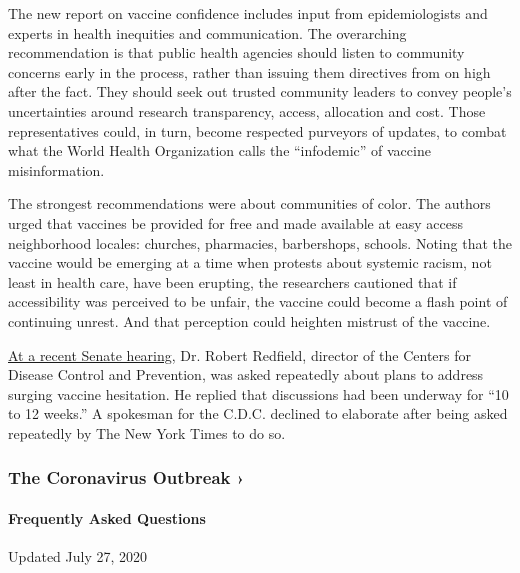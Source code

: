 The new report on vaccine confidence includes input from epidemiologists
and experts in health inequities and communication. The overarching
recommendation is that public health agencies should listen to community
concerns early in the process, rather than issuing them directives from
on high after the fact. They should seek out trusted community leaders
to convey people's uncertainties around research transparency, access,
allocation and cost. Those representatives could, in turn, become
respected purveyors of updates, to combat what the World Health
Organization calls the ``infodemic'' of vaccine misinformation.

The strongest recommendations were about communities of color. The
authors urged that vaccines be provided for free and made available at
easy access neighborhood locales: churches, pharmacies, barbershops,
schools. Noting that the vaccine would be emerging at a time when
protests about systemic racism, not least in health care, have been
erupting, the researchers cautioned that if accessibility was perceived
to be unfair, the vaccine could become a flash point of continuing
unrest. And that perception could heighten mistrust of the vaccine.

\href{https://www.nytimes3xbfgragh.onion/2020/06/30/us/politics/fauci-coronavirus.html}{At
a recent Senate hearing}, Dr. Robert Redfield, director of the Centers
for Disease Control and Prevention, was asked repeatedly about plans to
address surging vaccine hesitation. He replied that discussions had been
underway for ``10 to 12 weeks.'' A spokesman for the C.D.C. declined to
elaborate after being asked repeatedly by The New York Times to do so.

\href{https://www.nytimes3xbfgragh.onion/news-event/coronavirus?action=click\&pgtype=Article\&state=default\&region=MAIN_CONTENT_3\&context=storylines_faq}{}

\hypertarget{the-coronavirus-outbreak-}{%
\subsubsection{The Coronavirus Outbreak
›}\label{the-coronavirus-outbreak-}}

\hypertarget{frequently-asked-questions}{%
\paragraph{Frequently Asked
Questions}\label{frequently-asked-questions}}

Updated July 27, 2020

